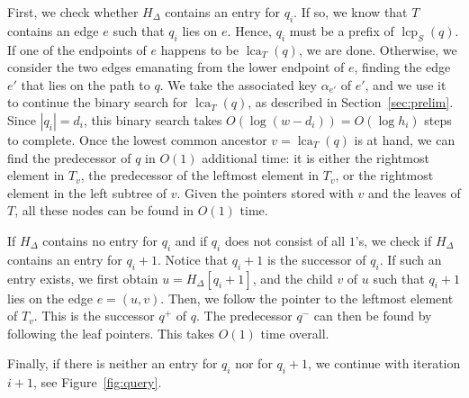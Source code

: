 \documentclass[a4paper,11pt]{article}
\newcommand{\?}{\mskip1.5mu}
\DeclareMathOperator{\lcp}{lcp} %
\DeclareMathOperator{\lca}{lca} %
\begin{document}
First, we check whether 
$H_\Delta$ contains an entry for
$q_i$. If so, we know that $T$ contains
an edge $e$ such that $q_i$ lies on $e$.
Hence, $q_i$ must be  a prefix of $\lcp_S(q)$.
If one of the endpoints of $e$ happens to be
$\lca_T(q)$, we are done.
Otherwise, we consider the two edges emanating from  the lower
endpoint of $e$, finding the edge $e'$ that lies on
the path to $q$.
We take the associated key $\alpha_{e'}$ of $e'$,
and we use it to continue the binary search
for $\lca_T(q)$, as described in
Section~\ref{sec:prelim}. Since $|q_i| = d_i$,
this binary search takes 
$O(\log (w - d_i)) = O(\log h_i)$ steps to complete.
Once the lowest common ancestor $v = \lca_T(q)$ is 
at hand,  we can find the predecessor of $q$ in $O(1)$ 
additional time: it is either the rightmost element in $T_v$,
the predecessor of the leftmost element in $T_v$, or the 
rightmost element in the left subtree of $v$. Given the 
pointers stored with $v$ and the leaves of $T$, all these
nodes can be found in $O(1)$ time.

If $H_\Delta$ contains no entry for
$q_i$ and if $q_i$ does not consist
of all $1$'s, we check if $H_\Delta$ contains
an entry for $q_i + 1$.
Notice that $q_i+1$ is the successor of $q_i$. 
If such an entry exists,
we first obtain $u = H_\Delta[q_i +1]$, and the child $v$ of 
$u$ such that $q_i + 1$ lies on the edge $e = (u,v)$.
Then, we follow the pointer to the leftmost element of
$T_v$. This is the successor $q^+$ of $q$. 
The predecessor $q^-$ can then be found by following the 
leaf pointers. This takes $O(1)$ time overall.

Finally, if there is neither an entry for $q_i$
nor for $q_i+1$, we continue 
with iteration $i+1$, see Figure~\ref{fig:query}.
\end{document}
